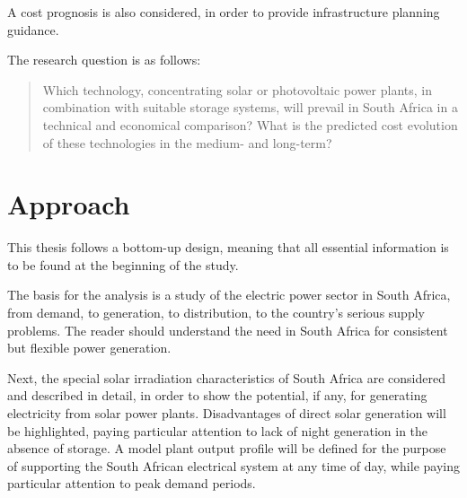 A cost prognosis is also considered, in order to provide infrastructure planning guidance.

The research question is as follows:
\begin{quote}
Which technology, concentrating solar or photovoltaic power plants, in combination with suitable storage systems, will prevail in South Africa in a technical and economical comparison? What is the predicted cost evolution of these technologies in the medium- and long-term?
\end{quote}


\section{Approach}

This thesis follows a bottom-up design, meaning that all essential information is to be found at the beginning of the study.


The basis for the analysis is a study of the electric power sector in South Africa, from demand, to generation, to distribution, to the country's serious supply problems. The reader should understand the need in South Africa for consistent but flexible power generation.


Next, the special solar irradiation characteristics of South Africa are considered and described in detail, in order to show the potential, if any, for generating electricity from solar power plants. Disadvantages of direct solar generation will be highlighted, paying particular attention to lack of night generation in the absence of storage. A model plant output profile will be defined for the purpose of supporting the South African electrical system at any time of day, while paying particular attention to peak demand periods.

